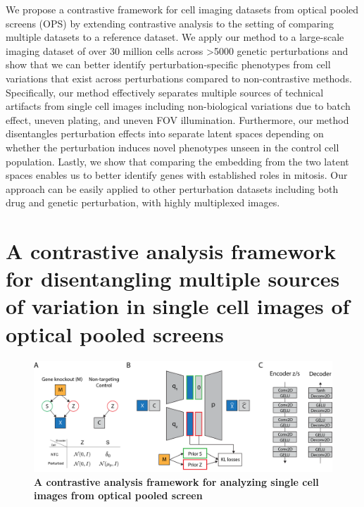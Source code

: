\documentclass{article}
\begin{document}
We propose a contrastive framework for cell imaging datasets from optical pooled screens (OPS) by extending contrastive analysis to the setting of comparing multiple datasets to a reference dataset. We apply our method to a large-scale imaging dataset of over 30 million cells across >5000 genetic perturbations and show that we can better identify perturbation-specific phenotypes from cell variations that exist across perturbations compared to non-contrastive methods.
Specifically, our method effectively separates multiple sources of technical artifacts from single cell images including non-biological variations due to batch effect, uneven plating, and uneven FOV illumination. Furthermore, our method disentangles perturbation effects into separate latent spaces depending on whether the perturbation induces novel phenotypes unseen in the control cell population. Lastly, we show that comparing the embedding from the two latent spaces enables us to better identify genes with established roles in mitosis.
Our approach can be easily applied to other perturbation datasets including both drug and genetic perturbation, with highly multiplexed images. 



\section*{A contrastive analysis framework for disentangling multiple sources of variation in single cell images of optical pooled screens
}

\begin{figure}[h!]
    \centering
    \includegraphics[width=\textwidth]{figure/figure_0.png}
    \caption{\textbf{A contrastive analysis framework for analyzing single cell images from optical pooled screen} }
    \label{fig:corum}
\end{figure}
\end{document}
